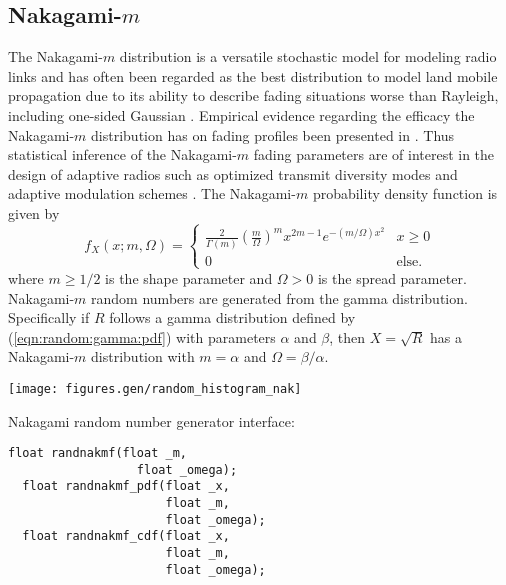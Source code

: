 \subsection{Nakagami-$m$}
\label{module:random:nakagamim}
The Nakagami-$m$ distribution is a versatile stochastic model for
modeling radio links \cite{Braun:1991} and has often been regarded as the
best distribution to model land mobile propagation due to its ability to
describe fading situations worse than Rayleigh, including one-sided
Gaussian \cite{Simon:1998}.
Empirical evidence regarding the efficacy the Nakagami-$m$ distribution
has on fading profiles been presented in \cite{Turin:1980, Suzuki:1977}.
Thus statistical inference of the Nakagami-$m$ fading parameters are of
interest in the design of adaptive radios such as optimized transmit
diversity modes \cite{Cavers:1999, Ko:2003} and adaptive modulation schemes
\cite{Catreux:2002}.
The Nakagami-$m$ probability density function is given by
\cite{Papoulis:2002}
%
\begin{equation}
\label{eqn:random:nakagamim:pdf}
    f_X(x;m,\Omega) =
    \begin{cases}
        \frac{2}{\Gamma(m)}
        \left( \frac{m}{\Omega} \right)^m
        x^{2m-1}
        e^{ -(m/\Omega)x^2}             & x \ge 0 \\
        0                               & \text{else}.
    \end{cases}
\end{equation}
%
where
$m \ge 1/2$ is the shape parameter and
$\Omega > 0$ is the spread parameter.
%
Nakagami-$m$ random numbers are generated from the gamma distribution.
Specifically if $R$ follows a gamma distribution defined by
(\ref{eqn:random:gamma:pdf}) with parameters $\alpha$ and $\beta$,
then $X=\sqrt{R}$ has a Nakagami-$m$ distribution with
$m=\alpha$ and $\Omega=\beta/\alpha$.


\begin{minipage}{0.5\textwidth}
  \texttt{[image: figures.gen/random\_histogram\_nak]}
\end{minipage}
\begin{minipage}{0.5\textwidth}
  Nakagami random number generator interface:
  \begin{Verbatim}[fontsize=\small]
  float randnakmf(float _m,
                  float _omega);
  float randnakmf_pdf(float _x,
                      float _m,
                      float _omega);
  float randnakmf_cdf(float _x,
                      float _m,
                      float _omega);
  \end{Verbatim}
\end{minipage}


